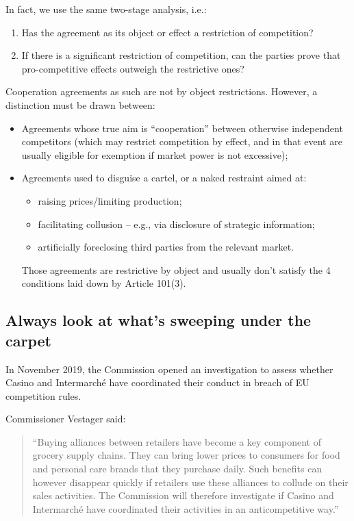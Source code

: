             In fact, we use the same two-stage analysis, i.e.:
            \begin{enumerate}[label=\alph*)]
                \item Has the agreement as its object or effect a restriction of competition?
                \item If there is a significant restriction of competition, can the parties prove that pro-competitive effects outweigh the restrictive ones?
            \end{enumerate}
            
            Cooperation agreements as such are not by object restrictions. However, a distinction must be drawn between:
            \begin{itemize}
                \item Agreements whose true aim is “cooperation” between otherwise independent competitors (which may restrict competition by effect, and in that event are usually eligible for exemption if market power is not excessive);
                \item Agreements used to disguise a cartel, or a naked restraint aimed at:
                \begin{itemize}
                    \item raising prices/limiting production;
                    \item facilitating collusion – e.g., via disclosure of strategic information;
                    \item artificially foreclosing third parties from the relevant market.
                \end{itemize}
                Those agreements are restrictive by object and usually don’t satisfy the 4 conditions laid down by Article 101(3).
            \end{itemize}

    \subsection{Always look at what’s sweeping under the carpet}

        In November 2019, the Commission opened an investigation to assess whether Casino and Intermarché have coordinated their conduct in breach of EU competition rules.

        Commissioner Vestager said:
        \begin{quote}
        “Buying alliances between retailers have become a key component of grocery supply chains. They can bring lower prices to consumers for food and personal care brands that they purchase daily. Such benefits can however disappear quickly if retailers use these alliances to collude on their sales activities. The Commission will therefore investigate if Casino and Intermarché have coordinated their activities in an anticompetitive way.”
        \end{quote}
        
